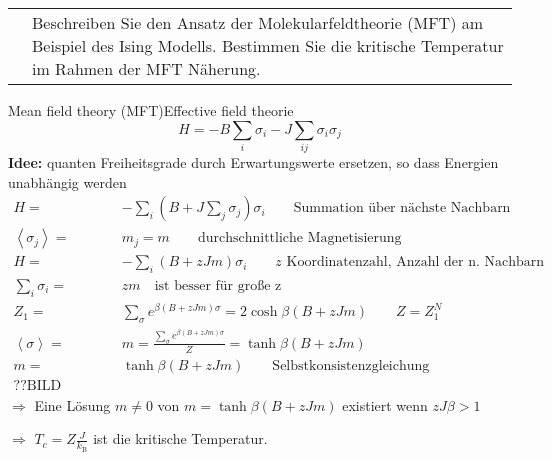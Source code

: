 \documentclass[a4paper,12pt]{scrartcl}
\makeatletter
\def\ka#1{\left(#1\right)}				%
\def\kb#1{\left\langle #1\right\rangle}			%
\def\kB{k_\mathrm{B}}					%
\newcounter{qc}\setcounter{qc}{1}
\newenvironment{fshaded}{
\def\FrameCommand{\fcolorbox{framecolor}{shadecolor}}
\MakeFramed {\FrameRestore}}
{\endMakeFramed}
\def\frage#1{
\begin{fshaded}
\noindent
\begin{tabularx}{0.99\textwidth}{@{}c!{\color{framecolor}\vline}X}
{ \bf \rm \theqc }	&	\noindent #1
\end{tabularx}
\stepcounter{qc}
\end{fshaded}
}
\makeatother
\begin{document}
\frage{Beschreiben Sie den Ansatz der Molekularfeldtheorie (MFT) am Beispiel des Ising Modells. Bestimmen Sie die kritische 
Temperatur im Rahmen der MFT Näherung.}
\noindent
Mean field theory (MFT)\qquad Effective field theorie
\[H=-B\sum_i\sigma_i-J\sum_{ij}\sigma_i\sigma_j\]
{\bf Idee:} quanten Freiheitsgrade durch Erwartungswerte ersetzen, so dass Energien unabhängig werden
\begin{align*}
	H=&-\sum_i\ka{B+J\sum_j\sigma_j}\sigma_i\qquad\text{Summation über nächste Nachbarn}\\
	\kb{\sigma_j}=&m_j=m\qquad\text{durchschnittliche Magnetisierung}\\
	H=&-\sum_i\ka{B+zJm}\sigma_i\qquad\text{$z$ Koordinatenzahl, Anzahl der n. Nachbarn}\\
	\sum_i\sigma_i=&zm\quad\text{ist besser für große z}\\
	Z_1=&\sum_\sigma e^{\beta(B+zJm)\sigma}=2\cosh\beta(B+zJm)\qquad Z=Z_1^N\\
	\kb\sigma=&m=\frac{\sum_\sigma e^{\beta(B+zJm)\sigma}}{Z}=\tanh\beta(B+zJm)\\
	m=&\tanh\beta(B+zJm)\qquad\text{Selbstkonsistenzgleichung}\\
	\text{??BILD einfügen??}
\end{align*}
$\Rightarrow$ Eine Lösung $m\neq0$ von $m=\tanh\beta(B+zJm)$ existiert wenn $zJ\beta>1$ 

$\Rightarrow$ $T_c=Z\frac J{\kB }$ ist die kritische Temperatur.
\end{document}
